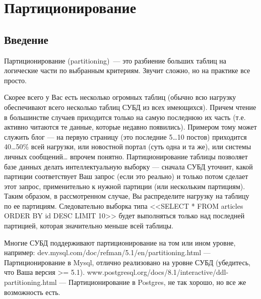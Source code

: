 \chapter{Партиционирование}
\begin{epigraphs}
\end{epigraphs}
\section{Введение}
Партиционирование (partitioning)~--- это разбиение больших таблиц на логические части по выбранным критериям. 
Звучит сложно, но на практике все просто.

Скорее всего у Вас есть несколько огромных таблиц (обычно всю нагрузку обеспечивают всего несколько таблиц СУБД из всех имеющихся). 
Причем чтение в большинстве случаев приходится только на самую последнюю их часть (т.е. активно читаются те данные, которые 
недавно появились). Примером тому может служить блог — на первую страницу (это последние 5\dots10 постов) приходится 40\dots50\% 
всей нагрузки, или новостной портал (суть одна и та же), или системы личных сообщений… впрочем понятно. Партиционирование 
таблицы позволяет базе данных делать интеллектуальную выборку — сначала СУБД уточнит, какой партиции соответствует Ваш запрос 
(если это реально) и только потом сделает этот запрос, применительно к нужной партиции (или нескольким партициям). Таким образом, 
в рассмотренном случае, Вы распределите нагрузку на таблицу по ее партициям. Следовательно выборка типа 
<<SELECT * FROM articles ORDER BY id DESC LIMIT 10>> будет выполняться только над последней партицией, которая значительно 
меньше всей таблицы.

Многие СУБД поддерживают партиционирование на том или ином уровне, например:
dev.mysql.com/doc/refman/5.1/en/partitioning.html — Партиционирование в Mysql, 
отлично реализовано на уровне СУБД (убедитесь, что Ваша версия >= 5.1).
www.postgresql.org/docs/8.1/interactive/ddl-partitioning.html — Партиционирование в Postgres, 
не так хорошо, но все же возможность есть.